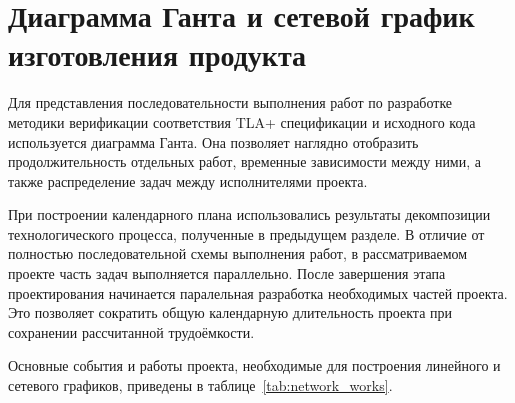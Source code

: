 \section{Диаграмма Ганта и сетевой график изготовления продукта}

Для представления последовательности выполнения работ по разработке
методики верификации соответствия TLA+ спецификации и исходного кода
используется диаграмма Ганта. Она позволяет наглядно отобразить
продолжительность отдельных работ, временные зависимости между ними,
а также распределение задач между исполнителями проекта.

При построении календарного плана использовались результаты
декомпозиции технологического процесса, полученные в предыдущем разделе. В
отличие от полностью последовательной схемы выполнения работ, в рассматриваемом
проекте часть задач выполняется параллельно. После завершения этапа
проектирования начинается паралельная разработка необходимых частей проекта.
Это позволяет сократить общую календарную длительность проекта при сохранении
рассчитанной трудоёмкости.

Основные события и работы проекта, необходимые для построения
линейного и сетевого графиков, приведены в
таблице~\ref{tab:network_works}.

